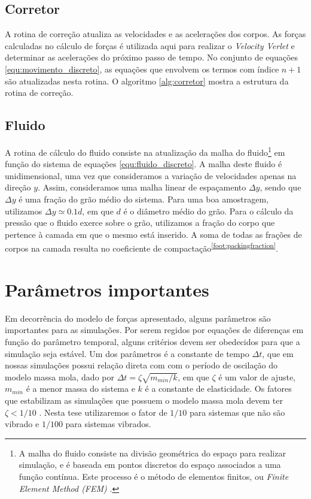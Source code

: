 

\subsection{Corretor}
    A rotina de correção atualiza as velocidades e as acelerações dos corpos. As forças calculadas no cálculo de forças é utilizada aqui para realizar o \textit{Velocity Verlet} e determinar as acelerações do próximo passo de tempo. No conjunto de equações \ref{equ:movimento_discreto}, as equações que envolvem os termos com índice $n+1$ são atualizadas nesta rotina. O algoritmo \ref{alg:corretor} mostra a estrutura da rotina de correção.



\subsection{Fluido}
    A rotina de cálculo do fluido consiste na atualização da malha do fluido\footnote{A malha do fluido consiste na divisão geométrica do espaço para realizar simulação, e é baseada em pontos discretos do espaço associados a uma função contínua. Este processo é o método de elementos finitos, ou \textit{Finite Element Method (FEM)} \cite{Numerical_Heat_Transfer_and_Fluid_Flow}.} em função do sistema de equações \ref{equ:fluido_discreto}. A malha deste fluido é unidimensional, uma vez que consideramos a variação de velocidades apenas na direção $y$. Assim, consideramos uma malha linear de espaçamento $\Delta y$, sendo que $\Delta y$ é uma fração do grão médio do sistema. Para uma boa amostragem, utilizamos $\Delta y \simeq 0.1 d$, em que $d$ é o diâmetro médio do grão. Para o cálculo da pressão que o fluido exerce sobre o grão, utilizamos a fração do corpo que pertence à camada em que o mesmo está inserido. A soma de todas as frações de corpos na camada resulta no coeficiente de compactação\textsuperscript{\ref{foot:packingfraction}}.



\section{Parâmetros importantes}
    Em decorrência do modelo de forças apresentado, alguns parâmetros são importantes para as simulações. Por serem regidos por equações de diferenças em função do parâmetro temporal, alguns critérios devem ser obedecidos para que a simulação seja estável. Um dos parâmetros é a constante de tempo $\Delta t$, que em nossas simulações possui relação direta com com o período de oscilação do modelo massa mola, dado por $\Delta t = \zeta \sqrt{m_{min}/k}$, em que $\zeta$ é um valor de ajuste, $m_{min}$ é a menor massa do sistema e $k$ é a constante de elasticidade. Os fatores que estabilizam as simulações que possuem o modelo massa mola devem ter $\zeta < 1/10$ \cite{Dissertacao, Caio-Tese, Computer_Simulation_of_Liquids}. Nesta tese utilizaremos o fator de $1/10$ para sistemas que não são vibrado e $1/100$ para sistemas vibrados.

